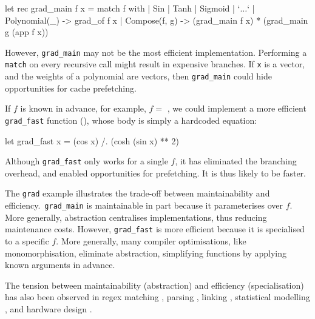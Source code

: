 \begin{code}
\begin{ocamllst}
let rec grad_main f x = match f with
  | Sin
  | Tanh
  | Sigmoid
  | `$\ldots$`
  | Polynomial(_) -> grad_of f x 
  | Compose(f, g) -> (grad_main f x) * (grad_main g (app f x))
\end{ocamllst}
%
\label{listing:ocaml-grad-main}
\end{code}

However, \texttt{grad_main} may not be the most efficient implementation. Performing a \texttt{match} on every recursive call might result in expensive branches. If \texttt{x} is a vector, and the weights of a polynomial are vectors, then \texttt{grad_main} could hide opportunities for cache prefetching.

If $f$ is known in advance, for example, $f =$ , we could implement a more efficient \texttt{grad_fast} function (), whose body is simply a hardcoded equation:

\begin{code}
\begin{ocamllst}
let grad_fast x = (cos x) /. (cosh (sin x) ** 2)
\end{ocamllst}
\label{listing:ocaml-grad-fast}
\end{code}    

Although \texttt{grad_fast} only works for a single $f$, it has eliminated the branching overhead, and enabled opportunities for prefetching. It is thus likely to be faster.

The \texttt{grad} example illustrates the trade-off between maintainability and efficiency.\ \texttt{grad_main} is maintainable in part because it parameterises over $f$. More generally, abstraction centralises implementations, thus reducing maintenance costs. However, \texttt{grad_fast} is more efficient because it is specialised to a specific $f$. More generally, many compiler optimisations, like monomorphisation, eliminate abstraction, simplifying functions by applying known arguments in advance. 

The tension between maintainability (abstraction) and efficiency (specialisation) has also been observed in regex matching \citep{tratt-2008}, parsing \citep{yallop-2023}, linking \citep{servetto-2013}, statistical modelling \citep{wickham-2019}, and hardware design \citep{vandebon-2021}.

